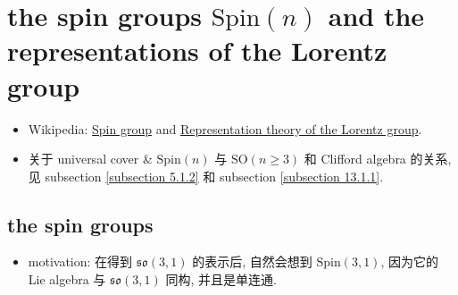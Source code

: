 \chapter{the spin groups \texorpdfstring{$\mathrm{Spin}(n)$}{Spin(n)} and the representations of the Lorentz group}
\begin{itemize}
	\item Wikipedia: \href{https://en.wikipedia.org/wiki/Spin_group}{Spin group} and \href{https://en.wikipedia.org/wiki/Representation_theory_of_the_Lorentz_group}{Representation theory of the Lorentz group}.
	
	\item 关于 universal cover \& $\mathrm{Spin}(n)$ 与 $\mathrm{SO}(n \geq 3)$ 和 Clifford algebra 的关系, 见 subsection \ref{subsection 5.1.2} 和 subsection \ref{subsection 13.1.1}.
\end{itemize}

\section{the spin groups}
\begin{itemize}
	\item motivation: 在得到 $\mathfrak{so}(3, 1)$ 的表示后, 自然会想到 $\mathrm{Spin}(3, 1)$, 因为它的 Lie algebra 与 $\mathfrak{so}(3, 1)$ 同构, 并且是单连通.
\end{itemize}

